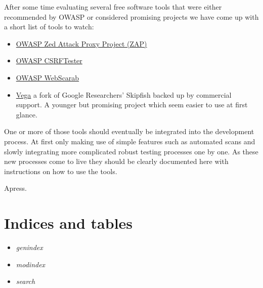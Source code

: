 \documentclass[letterpaper,10pt,english]{sphinxmanual}
\begin{document}
After some time evaluating several free software tools that were
either recommended by OWASP or considered promising projects we have
come up with a short list of tools to watch:
\begin{itemize}
\item {} 
\href{https://www.owasp.org/index.php/OWASP\_Zed\_Attack\_Proxy\_Project}{OWASP Zed Attack Proxy Project (ZAP)}

\item {} 
\href{https://www.owasp.org/index.php/Category:OWASP\_CSRFTester\_Project}{OWASP CSRFTester}

\item {} 
\href{https://www.owasp.org/index.php/Category:OWASP\_WebScarab\_Project}{OWASP WebScarab}

\item {} 
\href{http://www.subgraph.com/}{Vega} a fork of Google Researchers' Skipfish backed up by
commercial support. A younger but promising project which seem
easier to use at first glance.

\end{itemize}

One or more of those tools should eventually be integrated into the
development process. At first only making use of simple features such
as automated scans and slowly integrating more complicated robust
testing processes one by one. As these new processes come to live they
should be clearly documented here with instructions on how to use the
tools.

Apress.


\chapter{Indices and tables}
\label{index:indices-and-tables}\begin{itemize}
\item {} 
\emph{genindex}

\item {} 
\emph{modindex}

\item {} 
\emph{search}

\end{itemize}

\begin{thebibliography}{REST-SERV}
\end{thebibliography}



\renewcommand{\indexname}{Index}
\printindex
\end{document}
